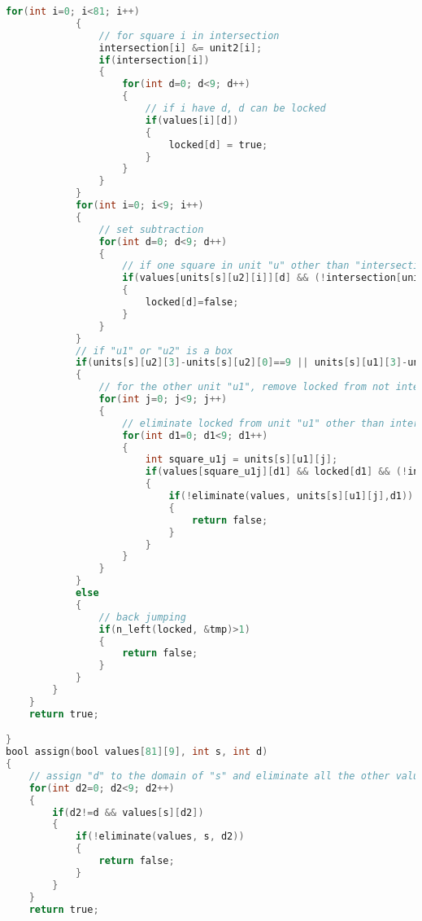 \documentclass[a4paper, 12pt]{report}
\begin{document}
\begin{appendices}
\begin{lstlisting}[frame=single, language=C]
            for(int i=0; i<81; i++)
            {
                // for square i in intersection
                intersection[i] &= unit2[i];
                if(intersection[i])
                {
                    for(int d=0; d<9; d++)
                    {
                        // if i have d, d can be locked
                        if(values[i][d])
                        {
                            locked[d] = true;
                        }
                    }
                }
            }
            for(int i=0; i<9; i++)
            {
                // set subtraction
                for(int d=0; d<9; d++)
                {
                    // if one square in unit "u" other than "intersection" has a digit "d"
                    if(values[units[s][u2][i]][d] && (!intersection[units[s][u2][i]]))
                    {
                        locked[d]=false;
                    }
                }
            }
            // if "u1" or "u2" is a box
            if(units[s][u2][3]-units[s][u2][0]==9 || units[s][u1][3]-units[s][u1][0]==9)
            {
                // for the other unit "u1", remove locked from not intersected squares
                for(int j=0; j<9; j++)
                {
                    // eliminate locked from unit "u1" other than intersection
                    for(int d1=0; d1<9; d1++)
                    {
                        int square_u1j = units[s][u1][j];
                        if(values[square_u1j][d1] && locked[d1] && (!intersection[square_u1j]))
                        {
                            if(!eliminate(values, units[s][u1][j],d1))
                            {
                                return false;
                            }
                        }
                    }
                }
            }
            else
            {
                // back jumping
                if(n_left(locked, &tmp)>1)
                {
                    return false;
                }
            }
        }
    }
    return true;

}
bool assign(bool values[81][9], int s, int d)
{
    // assign "d" to the domain of "s" and eliminate all the other values, if contradict return false, else return true
    for(int d2=0; d2<9; d2++)
    {
        if(d2!=d && values[s][d2])
        {
            if(!eliminate(values, s, d2))
            {
                return false;
            }
        }
    }
    return true;


\end{lstlisting}
\end{appendices}
\end{document}
